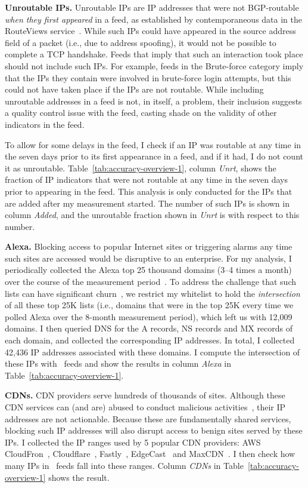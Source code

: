 \textbf{Unroutable IPs.} Unroutable IPs are IP addresses that
were not BGP-routable \emph{when they first appeared} in a feed, as
established by contemporaneous data in the RouteViews
service~\cite{Routeview}. While such IPs could have appeared in the
source address field of a packet (i.e., due to address spoofing), it
would not be possible to complete a TCP handshake. Feeds that imply
that such an interaction took place should not include such IPs. For
example, feeds in the Brute-force category imply that the IPs they
contain were involved in brute-force login attempts, but this could
not have taken place if the IPs are not routable. While including
unroutable addresses in a feed is not, in itself, a problem, their
inclusion suggests a quality control issue with the feed, casting
shade on the validity of other indicators in the feed.

To allow for some delays in the feed, I check if an IP was routable
at any time in the seven days prior to its first appearance in a feed,
and if it had, I do not count it as
unroutable. Table~\ref{tab:accuracy-overview-1}, column \textit{Unrt},
shows the fraction of IP indicators that were not routable at any time
in the seven days prior to appearing in the feed. This analysis is
only conducted for the IPs that are added after my measurement
started. The number of such IPs is shown in column \textit{Added}, and
the unroutable fraction shown in \textit{Unrt} is with respect to this
number.

\textbf{Alexa.} Blocking access to popular Internet sites or
triggering alarms any time such sites are accessed would be disruptive
to an enterprise. For my analysis, I periodically collected the
Alexa top 25 thousand domains (3--4 times a month) over the course of
the measurement period~\cite{alexa}. To address the challenge that
such lists can have significant churn~\cite{scheitle2018long}, we
restrict my whitelist to hold the \emph{intersection} of all these
top 25K lists (i.e., domains that were in the top 25K every time we
polled Alexa over the 8-month measurement period), which left us with
12,009 domains. I then queried DNS for the A records, NS
records and MX records of each domain, and collected the corresponding
IP addresses. In total, I collected 42,436 IP addresses associated
with these domains. I compute the intersection of these IPs
with \ti\ feeds and show the results in column \textit{Alexa} in
Table~\ref{tab:accuracy-overview-1}.


\textbf{CDNs.} CDN providers serve hundreds of thousands of
sites. Although these CDN services can (and are) abused to conduct
malicious activities~\cite{cdnabuse}, their IP addresses are not
actionable.  Because these are fundamentally shared services,
blocking such IP addresses will also disrupt access to benign
sites served by these IPs.  I collected the IP ranges used by 5
popular CDN providers: AWS CloudFron~\cite{cloudfront},
Cloudflare~\cite{cloudflare}, Fastly~\cite{fastly},
EdgeCast~\cite{edgecast} and MaxCDN~\cite{maxcdn}. I then check how
many IPs in \ti\ feeds fall into these ranges. Column \textit{CDNs} in
Table~\ref{tab:accuracy-overview-1} shows the result.

